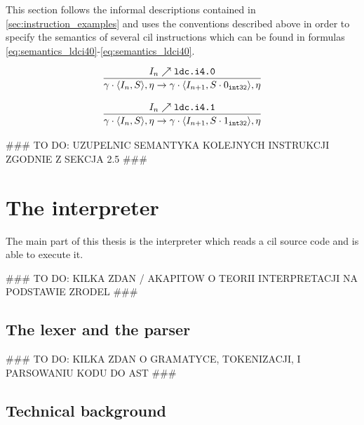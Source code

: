 \documentclass{article}
\numberwithin{equation}{section}
\newcommand{\mstate}[2]{
	\langle#1, #2\rangle
}
\newcommand{\ipointsto}[2] {
	#1 \nearrow \texttt{#2}
}
\newcommand{\sval}[2] {
	#1_\texttt{#2}
}
\begin{document}
This section follows the informal descriptions contained in \ref{sec:instruction_examples} and uses the conventions described above in order to specify the semantics of several \acrshort{cil} instructions which can be found in formulas \ref{eq:semantics_ldci40}-\ref{eq:semantics_ldci40}.

\begin{equation}
	\infer{
		\gamma \cdot \mstate{I_n}{S}, \eta
			\rightarrow
		\gamma \cdot \mstate{I_{n+1}}{S \cdot \sval{0}{int32}}, \eta
	}
	{\ipointsto{I_n}{ldc.i4.0}}
\end{equation}

\begin{equation}
	\infer{
		\gamma \cdot \mstate{I_n}{S}, \eta
			\rightarrow
		\gamma \cdot \mstate{I_{n+1}}{S \cdot \sval{1}{int32}}, \eta
	}
	{\ipointsto{I_n}{ldc.i4.1}}
\end{equation}

\#\#\# TO DO: UZUPELNIC SEMANTYKA KOLEJNYCH INSTRUKCJI ZGODNIE Z SEKCJA 2.5 \#\#\#

\clearpage


\section{The interpreter}

The main part of this thesis is the interpreter which reads a \acrshort{cil} source code and is able to execute it.

\#\#\# TO DO: KILKA ZDAN / AKAPITOW O TEORII INTERPRETACJI NA PODSTAWIE ZRODEL \#\#\#

\subsection{The lexer and the parser}

\#\#\# TO DO: KILKA ZDAN O GRAMATYCE, TOKENIZACJI, I PARSOWANIU KODU DO AST \#\#\#

\subsection{Technical background}
\end{document}
